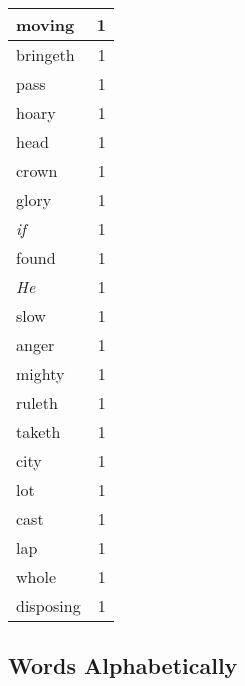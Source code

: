 \begin{center}
\begin{longtable}{l|r}
moving & 1\\ \hline 
bringeth & 1\\ \hline 
pass & 1\\ \hline 
hoary & 1\\ \hline 
head & 1\\ \hline 
crown & 1\\ \hline 
glory & 1\\ \hline 
\emph{if} & 1\\ \hline 
found & 1\\ \hline 
\emph{He} & 1\\ \hline 
slow & 1\\ \hline 
anger & 1\\ \hline 
mighty & 1\\ \hline 
ruleth & 1\\ \hline 
taketh & 1\\ \hline 
city & 1\\ \hline 
lot & 1\\ \hline 
cast & 1\\ \hline 
lap & 1\\ \hline 
whole & 1\\ \hline 
disposing & 1\\ \hline 
\end{longtable}  
\end{center}  


  
\normalsize  

  
  


\subsection{Words Alphabetically}

